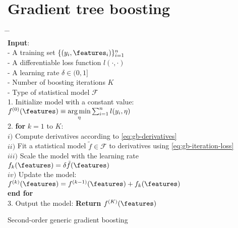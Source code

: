 \section{Gradient tree boosting}
\label{sec:gradient tree boosting}
\begin{algorithm*}[h!]
	\begin{tabbing}
		\hspace{2em} \= \hspace{2em} \= \hspace{2em} \= \\
		{\bfseries Input}: \\
		\> - A training set $\{(y_i, \features_{i})\}_{i=1}^n$\\
		\> - A differentiable loss function $l(\cdot,\cdot)$\\
		\> - A learning rate $\delta\in(0,1]$\\
		\> - Number of boosting iterations $K$\\
		\> - Type of statistical model $\mathcal{F}$\\
		
		1. Initialize model with a constant value:\\
		\>	$f^{(0)}(\features) \equiv \underset{\eta}{\arg\min} \sum_{i=1}^n l(y_i, \eta)$\\
		
		2. {\bfseries for} $k = 1$ to $K$:\\
		
		\>	$i)$ Compute derivatives according to \eqref{eq:gb-derivatives}\\
		
		\> $ii)$ Fit a statistical model $\tilde{f}\in \mathcal{F}$ to derivatives using \eqref{eq:gb-iteration-loss} \\
		
		\> $iii)$ Scale the model with the learning rate\\
		\>\> $f_k(\features)= \delta \tilde{f}(\features)$ \\%
		
		\>	$iv)$ Update the model:\\
		\>\>	$f^{(k)}(\features) = f^{(k-1)}(\features) + f_k(\features)$\\
		{\bfseries end for} \\
		
		3. Output the model: {\bfseries Return} $f^{(K)}(\features)$%
		
	\end{tabbing}
	
	\vspace{0.5cm}
	\vspace{0.5cm}
	
	\caption{\label{alg:gradient-boosting} Second-order generic gradient boosting \cite{friedman2001elements} }
\end{algorithm*}
